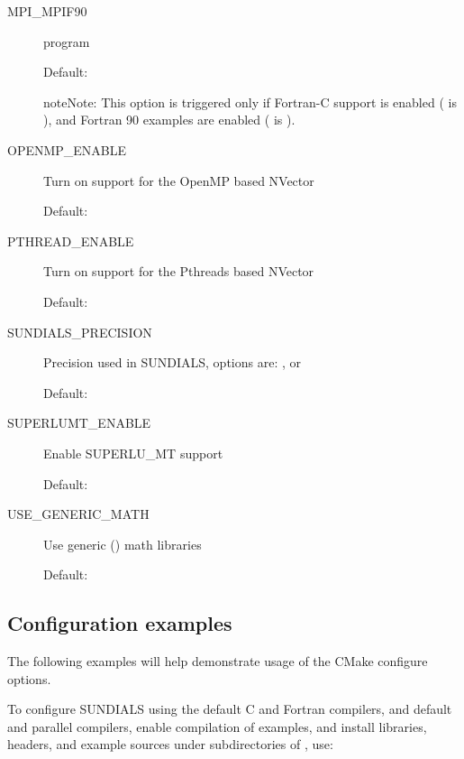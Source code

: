 \documentclass[letterpaper,10pt,english]{sphinxmanual}
\begin{document}
\begin{description}
\item[{MPI\_MPIF90}] \leavevmode
{} program

Default:

\begin{notice}{note}{Note:}
This option is triggered only if Fortran-C support is enabled
( is ), and Fortran 90 examples are enabled
( is ).
\end{notice}

\item[{OPENMP\_ENABLE}] \leavevmode
Turn on support for the OpenMP based NVector

Default: 

\item[{PTHREAD\_ENABLE}] \leavevmode
Turn on support for the Pthreads based NVector

Default: 

\item[{SUNDIALS\_PRECISION}] \leavevmode
Precision used in SUNDIALS, options are: ,  or

Default: 

\item[{SUPERLUMT\_ENABLE}] \leavevmode
Enable SUPERLU\_MT support

Default: 

\item[{USE\_GENERIC\_MATH}] \leavevmode
Use generic () math libraries

Default: 

\end{description}


\subsection{Configuration examples}
\label{Install:configuration-examples}\label{Install:installation-cmake-examples}
The following examples will help demonstrate usage of the CMake
configure options.

To configure SUNDIALS using the default C and Fortran compilers,
and default  and  parallel compilers,
enable compilation of examples, and install libraries, headers, and
example sources under subdirectories of , use:
\end{document}
